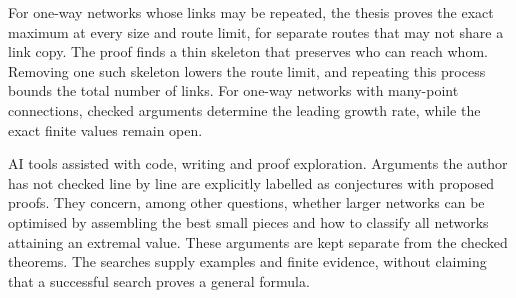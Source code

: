 \documentclass[11pt]{article}
\begin{document}
For one-way networks whose links may be repeated, the thesis proves the exact maximum at every size and route limit, for separate routes that may not share a link copy. The proof finds a thin skeleton that preserves who can reach whom. Removing one such skeleton lowers the route limit, and repeating this process bounds the total number of links. For one-way networks with many-point connections, checked arguments determine the leading growth rate, while the exact finite values remain open.

AI tools assisted with code, writing and proof exploration. Arguments the author has not checked line by line are explicitly labelled as conjectures with proposed proofs. They concern, among other questions, whether larger networks can be optimised by assembling the best small pieces and how to classify all networks attaining an extremal value. These arguments are kept separate from the checked theorems. The searches supply examples and finite evidence, without claiming that a successful search proves a general formula.
\end{document}
